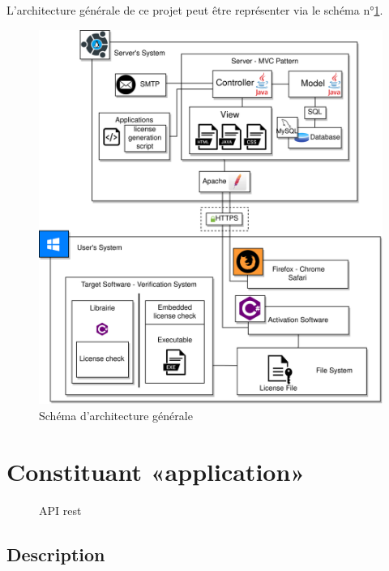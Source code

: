 L'architecture générale de ce projet peut être représenter via 
le schéma n°\ref{fig:fig1}.
\newpage

\begin{figure}[hp!]
	\centering
	\includegraphics[width=\textwidth]{../png/DAT_general.png}
	\caption{Schéma d'architecture générale}
	\label{fig:fig1}
\end{figure}

\newpage

\section{Constituant «application»}

\begin{figure}[p]
    \vspace{-0.5cm}
	\caption{API rest}
	
	\label{fig:fig2}
\end{figure}

\subsection*{Description}

